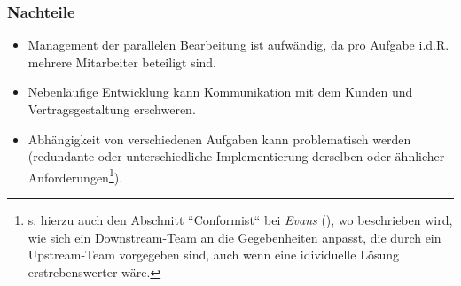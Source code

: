 \subsubsection*{Nachteile}

\begin{itemize}
    \item Management der parallelen Bearbeitung ist aufwändig, da pro Aufgabe i.d.R. mehrere Mitarbeiter beteiligt sind.
    \item Nebenläufige Entwicklung kann Kommunikation mit dem Kunden und Vertragsgestaltung erschweren.
    \item Abhängigkeit von verschiedenen Aufgaben kann problematisch werden (redundante oder unterschiedliche Implementierung derselben oder ähnlicher Anforderungen\footnote{
    s. hierzu auch den Abschnitt ``Conformist`` bei \textit{Evans} (\cite[361]{Eva03}), wo beschrieben wird, wie sich ein Downstream-Team an die Gegebenheiten anpasst, die durch ein Upstream-Team vorgegeben sind, auch wenn eine idividuelle Lösung erstrebenswerter wäre.
    }).
\end{itemize}